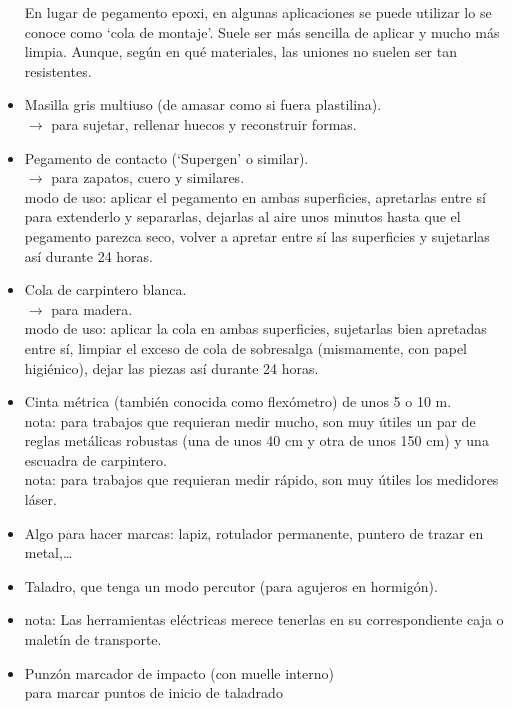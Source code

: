 \documentclass[spanish,10pt,a4paper,final,oneside]{article}
\begin{document}
\begin{itemize}
En lugar de pegamento epoxi, en algunas aplicaciones se puede utilizar lo se conoce como `cola de montaje'. Suele ser más sencilla de aplicar y mucho más limpia. Aunque, según en qué materiales, las uniones no suelen ser tan resistentes.

\item Masilla gris multiuso (de amasar como si fuera plastilina).
\\$\rightarrow$ para sujetar, rellenar huecos y reconstruir formas.

\item Pegamento de contacto (`Supergen' o similar).
\\$\rightarrow$ para zapatos, cuero y similares.
\\modo de uso: aplicar el pegamento en ambas superficies, apretarlas entre sí para extenderlo y separarlas, dejarlas al aire unos minutos hasta que el pegamento parezca seco, volver a apretar entre sí las superficies y sujetarlas así durante 24 horas.

\item Cola de carpintero blanca.
\\$\rightarrow$ para madera.
\\modo de uso: aplicar la cola en ambas superficies, sujetarlas bien apretadas entre sí, limpiar el exceso de cola de sobresalga (mismamente, con papel higiénico), dejar las piezas así durante 24 horas.

\item Cinta métrica (también conocida como flexómetro) de unos 5 o 10 m.
\\nota: para trabajos que requieran medir mucho, son muy útiles un par de reglas metálicas robustas (una de unos 40 cm y otra de unos 150 cm) y una escuadra de carpintero.
\\nota: para trabajos que requieran medir rápido, son muy útiles los medidores láser.

\item Algo para hacer marcas: lapiz, rotulador permanente, puntero de trazar en metal,\ldots

\item Taladro, que tenga un modo percutor (para agujeros en hormigón).
\item nota: Las herramientas eléctricas merece tenerlas en su correspondiente caja o maletín de transporte.

\item Punzón marcador de impacto (con muelle interno)
\\para marcar puntos de inicio de taladrado


\end{itemize}
\end{document}
